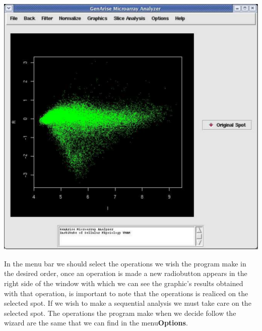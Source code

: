 \documentclass[12pt]{article}
\begin{document}
\begin{center}
\includegraphics[scale= 0.3]{./images/original.pdf}
\end{center}

In the menu bar we should select the operations we wish the program make in the desired order, once an operation is made  a new radiobutton appears in the right side of the window with which we can see the graphic's results obtained with that operation, is important to note that the operations is realiced on the selected spot. If we wish to make a sequential analysis we must take care on the selected spot. The operations the program make when we decide follow the wizard are the same that we can find in the menu\textbf{Options}.\\
\end{document}
